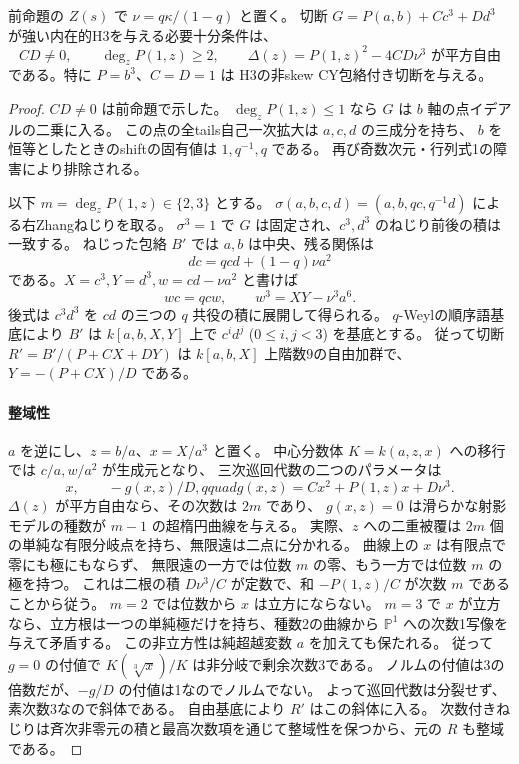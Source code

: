 \begin{theorem}\label{thm:cubic-CY-one-segre-square-split-resonance-exact}
前命題の $Z(s)$ で $\nu=q\kappa/(1-q)$ と置く。
切断 $G=P(a,b)+C c^3+D d^3$ が強い内在的H3を与える必要十分条件は、
\[
 CD\ne0,\qquad \deg_z P(1,z)\ge 2,\qquad
 \Delta(z)=P(1,z)^2-4CD\nu^3\text{ が平方自由}
\]
である。特に $P=b^3$、$C=D=1$ は
H3の非skew CY包絡付き切断を与える。
\end{theorem}
\begin{proof}
$CD\ne0$ は前命題で示した。
$\deg_z P(1,z)\le1$ なら $G$ は $b$ 軸の点イデアルの二乗に入る。
この点の全tails自己一次拡大は $a,c,d$ の三成分を持ち、
$b$ を恒等としたときのshiftの固有値は $1,q^{-1},q$ である。
再び奇数次元・行列式1の障害により排除される。

以下 $m=\deg_z P(1,z)\in\{2,3\}$ とする。
$\sigma(a,b,c,d)=(a,b,qc,q^{-1}d)$ による右Zhangねじりを取る。
$\sigma^3=1$ で $G$ は固定され、$c^3,d^3$ のねじり前後の積は一致する。
ねじった包絡 $B'$ では $a,b$ は中央、残る関係は
\[
 dc=q cd+(1-q)\nu a^2
\]
である。$X=c^3,Y=d^3,w=cd-\nu a^2$ と書けば
\[
 wc=qcw,\qquad w^3=XY-\nu^3a^6 .
\]
後式は $c^3d^3$ を $cd$ の三つの $q$ 共役の積に展開して得られる。
$q$-Weylの順序語基底により $B'$ は $k[a,b,X,Y]$ 上で
$c^i d^j$ ($0\le i,j<3$) を基底とする。
従って切断 $R'=B'/(P+CX+DY)$ は $k[a,b,X]$ 上階数9の自由加群で、
$Y=-(P+CX)/D$ である。

\paragraph{整域性}
$a$ を逆にし、$z=b/a$、$x=X/a^3$ と置く。
中心分数体 $K=k(a,z,x)$ への移行では $c/a,w/a^2$ が生成元となり、
三次巡回代数の二つのパラメータは
\[
 x,\qquad -g(x,z)/D,qquad
 g(x,z)=C x^2+P(1,z)x+D\nu^3 .
\]
$\Delta(z)$ が平方自由なら、その次数は $2m$ であり、
$g(x,z)=0$ は滑らかな射影モデルの種数が $m-1$ の超楕円曲線を与える。
実際、$z$ への二重被覆は $2m$ 個の単純な有限分岐点を持ち、無限遠は二点に分かれる。
曲線上の $x$ は有限点で零にも極にもならず、
無限遠の一方では位数 $m$ の零、もう一方では位数 $m$ の極を持つ。
これは二根の積 $D\nu^3/C$ が定数で、和 $-P(1,z)/C$ が次数 $m$ であることから従う。
$m=2$ では位数から $x$ は立方にならない。
$m=3$ で $x$ が立方なら、立方根は一つの単純極だけを持ち、種数2の曲線から
$\mathbb P^1$ への次数1写像を与えて矛盾する。
この非立方性は純超越変数 $a$ を加えても保たれる。
従って $g=0$ の付値で $K(\sqrt[3]{x})/K$ は非分岐で剰余次数3である。
ノルムの付値は3の倍数だが、$-g/D$ の付値は1なのでノルムでない。
よって巡回代数は分裂せず、素次数3なので斜体である。
自由基底により $R'$ はこの斜体に入る。
次数付きねじりは斉次非零元の積と最高次数項を通じて整域性を保つから、元の $R$ も整域である。


\end{proof}
